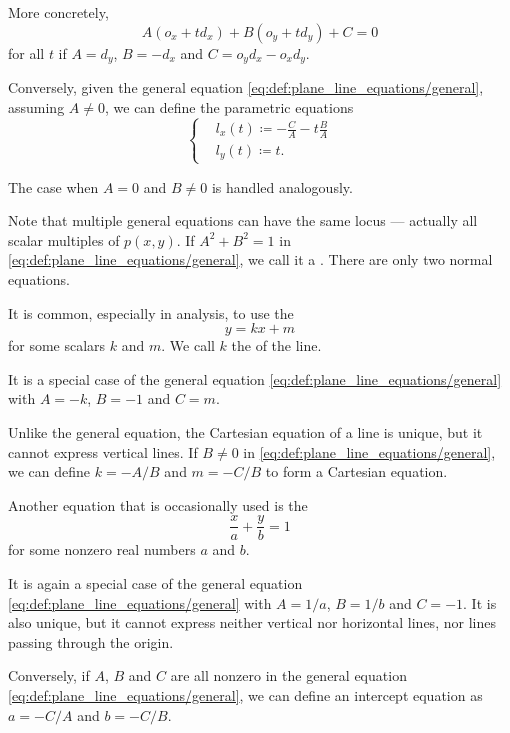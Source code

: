 \begin{definition}
\begin{thmenum}
    More concretely,
    \begin{equation*}
      A(o_x + td_x) + B(o_y + td_y) + C = 0
    \end{equation*}
    for all \( t \) if \( A = d_y \), \( B = -d_x \) and \( C = o_y d_x - o_x d_y \).

    Conversely, given the general equation \eqref{eq:def:plane_line_equations/general}, assuming \( A \neq 0 \), we can define the parametric equations
    \begin{equation*}
      \begin{cases}
        &l_x(t) \coloneqq -\tfrac C A - t \tfrac B A  \\
        &l_y(t) \coloneqq t.
      \end{cases}
    \end{equation*}

    The case when \( A = 0 \) and \( B \neq 0 \) is handled analogously.

    Note that multiple general equations can have the same locus --- actually all scalar multiples of \( p(x, y) \). If \( A^2 + B^2 = 1 \) in \eqref{eq:def:plane_line_equations/general}, we call it a . There are only two normal equations.

     It is common, especially in analysis, to use the 
    \begin{equation}\label{eq:def:plane_line_equations/cartesian}
      y = kx + m
    \end{equation}
    for some scalars \( k \) and \( m \). We call \( k \) the  of the line.

    It is a special case of the general equation \eqref{eq:def:plane_line_equations/general} with \( A = -k \), \( B = -1 \) and \( C = m \).

    Unlike the general equation, the Cartesian equation of a line is unique, but it cannot express vertical lines. If \( B \neq 0 \) in \eqref{eq:def:plane_line_equations/general}, we can define \( k = -A / B \) and \( m = -C / B \) to form a Cartesian equation.

     Another equation that is occasionally used is the 
    \begin{equation}\label{eq:def:plane_line_equations/intercept}
      \frac x a + \frac y b = 1
    \end{equation}
    for some nonzero real numbers \( a \) and \( b \).

    It is again a special case of the general equation \eqref{eq:def:plane_line_equations/general} with \( A = 1 / a \), \( B = 1 / b \) and \( C = -1 \). It is also unique, but it cannot express neither vertical nor horizontal lines, nor lines passing through the origin.

    Conversely, if \( A \), \( B \) and \( C \) are all nonzero in the general equation \eqref{eq:def:plane_line_equations/general}, we can define an intercept equation as \( a = -C / A \) and \( b = -C / B \).
  \end{thmenum}
\end{definition}

